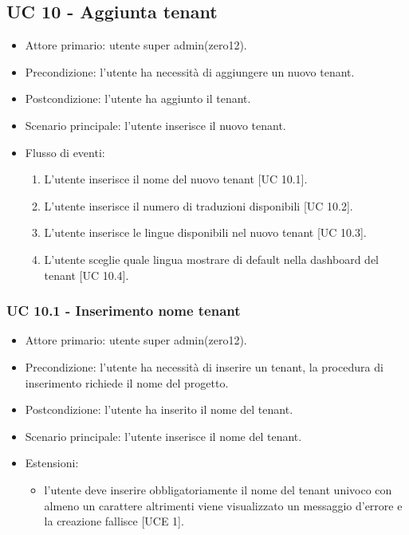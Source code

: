 \subsection{UC 10 - Aggiunta tenant}
    \begin{itemize}
        \item Attore primario: utente super admin(zero12).
        \item Precondizione: l'utente ha necessità di aggiungere un nuovo tenant.
        \item Postcondizione: l'utente ha aggiunto il tenant.
        \item Scenario principale: l'utente inserisce il nuovo tenant.
        \item Flusso di eventi:
        \begin{enumerate}
            \item L'utente inserisce il nome del nuovo tenant [UC 10.1].
            \item L'utente inserisce il numero di traduzioni disponibili [UC 10.2].
            \item L'utente inserisce le lingue disponibili nel nuovo tenant [UC 10.3].
            \item L'utente sceglie quale lingua mostrare di default nella dashboard del tenant [UC 10.4].
        \end{enumerate}
    \end{itemize}    
    \subsubsection{UC 10.1 - Inserimento nome tenant}
        \begin{itemize}
            \item Attore primario: utente super admin(zero12).
            \item Precondizione: l'utente ha necessità di inserire un tenant, la procedura di inserimento richiede il nome del progetto.
            \item Postcondizione: l'utente ha inserito il nome del tenant.
            \item Scenario principale: l'utente inserisce il nome del tenant.
            \item Estensioni: 
                \begin{itemize}
                    \item l'utente deve inserire obbligatoriamente il nome del tenant univoco con almeno un carattere altrimenti viene visualizzato un messaggio d'errore e la creazione fallisce [UCE 1].
                \end{itemize}
        \end{itemize}
